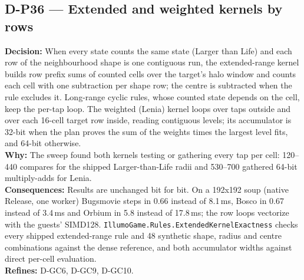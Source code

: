 \subsection*{D-P36 --- Extended and weighted kernels by rows}
\begin{decisionbox}[title={D-P36 \quad 2026-10-03}]
\textbf{Decision:} When every state counts the same state (Larger than Life)
and each row of the neighbourhood shape is one contiguous run, the
extended-range kernel builds row prefix sums of counted cells over the target's
halo window and counts each cell with one subtraction per shape row; the
centre is subtracted when the rule excludes it. Long-range cyclic rules, whose
counted state depends on the cell, keep the per-tap loop. The weighted
(Lenia) kernel loops over taps outside and over each 16-cell target row inside,
reading contiguous levels; its accumulator is 32-bit when the plan proves
the sum of the weights times the largest level fits, and 64-bit otherwise.\\
\textbf{Why:} The sweep found both kernels testing or gathering every tap per
cell: 120--440 compares for the shipped Larger-than-Life radii and 530--700
gathered 64-bit multiply-adds for Lenia.\\
\textbf{Consequences:} Results are unchanged bit for bit. On a 192x192 soup
(native Release, one worker) Bugsmovie steps in 0.66 instead of 8.1\,ms, Bosco
in 0.67 instead of 3.4\,ms and Orbium in 5.8 instead of 17.8\,ms; the row loops
vectorize with the guests' SIMD128. \texttt{IllumoGame.Rules.ExtendedKernelExactness}
checks every shipped extended-range rule and 48 synthetic shape, radius and
centre combinations against the dense reference, and both accumulator widths
against direct per-cell evaluation.\\
\textbf{Refines:} D-GC6, D-GC9, D-GC10.
\end{decisionbox}

